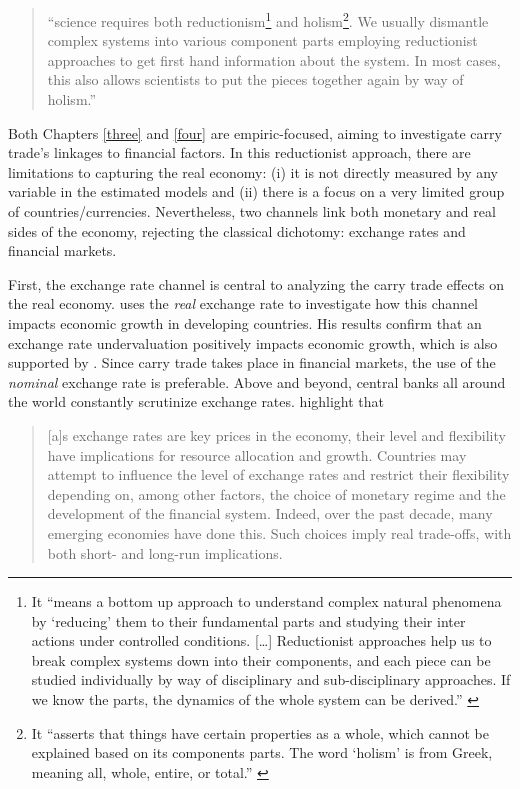 \documentclass[a4paper, twoside]{templates/ociamthesis}
\begin{document}
\begin{quote}
``science requires both reductionism\footnote{It ``means a bottom up approach to understand complex natural phenomena by `reducing' them to their fundamental parts and studying their inter actions under controlled conditions. {[}\ldots{]} Reductionist approaches help us to break complex systems down into their components, and each piece can be studied individually by way of disciplinary and sub-disciplinary approaches. If we know the parts, the dynamics of the whole system can be derived.'' \autocite[ 42]{thomas2021}} and holism\footnote{It ``asserts that things have certain properties as a whole, which cannot be explained based on its components parts. The word `holism' is from Greek, meaning all, whole, entire, or total.'' \autocite[ 43]{thomas2021}}. We usually dismantle complex systems into various component parts employing reductionist approaches to get first hand information about the system. In most cases, this also allows scientists to put the pieces together again by way of holism.'' \autocite[ 43]{thomas2021}
\end{quote}

Both Chapters \ref{three} and \ref{four} are empiric-focused, aiming to investigate carry trade's linkages to financial factors. In this reductionist approach, there are limitations to capturing the real economy: (i) it is not directly measured by any variable in the estimated models and (ii) there is a focus on a very limited group of countries/currencies. Nevertheless, two channels link both monetary and real sides of the economy, rejecting the classical dichotomy: exchange rates and financial markets.

First, the exchange rate channel is central to analyzing the carry trade effects on the real economy. \textcite{rodrik2008} uses the \emph{real} exchange rate to investigate how this channel impacts economic growth in developing countries. His results confirm that an exchange rate undervaluation positively impacts economic growth, which is also supported by \textcite{seraj2020}. Since carry trade takes place in financial markets, the use of the \emph{nominal} exchange rate is preferable. Above and beyond, central banks all around the world constantly scrutinize exchange rates. \textcite[ 12]{gadanecz2013} highlight that

\begin{quote}
{[}a{]}s exchange rates are key prices in the economy, their level and flexibility have implications for resource allocation and growth. Countries may attempt to influence the level of exchange rates and restrict their flexibility depending on, among other factors, the choice of monetary regime and the development of the financial system. Indeed, over the past decade, many emerging economies have done this. Such choices imply real trade-offs, with both short- and long-run implications.
\end{quote}
\end{document}

